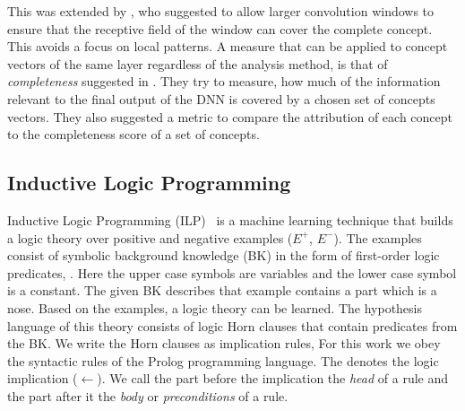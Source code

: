 This was extended by \cite{schwalbe_concept_2020}, who suggested to
allow larger convolution windows
to ensure that the receptive field of the window can cover
the complete concept. This avoids a focus on local patterns.
% 
A measure that can be applied to concept vectors of the same layer
regardless of the analysis method, is that of
\emph{completeness} suggested in \cite{yeh_completeness-aware_2020}.
They try to measure, how much of the information relevant to the final
output of the DNN is covered by a chosen set of concepts vectors.
They also suggested a metric to compare the attribution of each
concept to the completeness score of a set of concepts.



\subsection{Inductive Logic Programming}\label{sec:ilp}

Inductive Logic Programming (ILP)~\cite{muggleton1991inductive} is a
machine learning technique that builds a logic theory over positive
and negative examples ($E^+$, $E^-$). The examples consist of symbolic
background knowledge (BK) in the form of first-order logic predicates,
\forexample {}. Here the
upper case symbols are variables and the lower case symbol is a
constant. The given BK describes that example 
contains a part  which is a nose. Based on the examples,
a logic theory can be learned. The hypothesis language of this theory
consists of logic Horn clauses that contain predicates from the BK. We
write the Horn clauses as implication rules,
\forexample
{}
For this work we obey the syntactic rules of the Prolog
programming language. The \ilprule{:-} denotes the logic implication
($\leftarrow$). We call the part before the implication the
\emph{head} of a rule and the part after it the \emph{body} or
\emph{preconditions} of a rule. 

